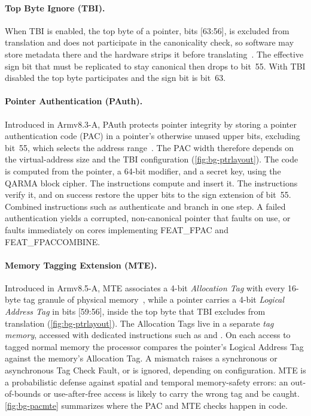 \paragraph{Top Byte Ignore (TBI).}
When TBI is enabled, the top byte of a pointer, bits [63:56], is excluded from translation and
does not participate in the canonicality check, so software may store metadata there and the
hardware strips it before translating~\cite{arm_tbi}. The effective sign bit that must be
replicated to stay canonical then drops to bit~55. With TBI disabled the top byte participates and
the sign bit is bit~63.

\paragraph{Pointer Authentication (PAuth).}
Introduced in Armv8.3-A, PAuth protects pointer integrity by storing a pointer authentication code
(PAC) in a pointer's otherwise unused upper bits, excluding bit~55, which selects the address
range~\cite{arm_pac,pac_whitepaper}. The PAC width therefore depends on the virtual-address size
and the TBI configuration (\autoref{fig:bg-ptrlayout}). The code is computed from the pointer, a
64-bit modifier, and a secret key, using the QARMA block cipher. The  instructions
compute and insert it. The  instructions verify it, and on success restore the upper bits
to the sign extension of bit~55. Combined instructions such as  authenticate and branch
in one step. A failed authentication yields a corrupted, non-canonical pointer that faults on use,
or faults immediately on cores implementing FEAT\_FPAC and FEAT\_FPACCOMBINE.

\paragraph{Memory Tagging Extension (MTE).}
Introduced in Armv8.5-A, MTE associates a 4-bit \emph{Allocation Tag} with every 16-byte tag
granule of physical memory~\cite{arm_mte,mte_whitepaper}, while a pointer carries a 4-bit
\emph{Logical Address Tag} in bits [59:56], inside the top byte that TBI excludes from translation
(\autoref{fig:bg-ptrlayout}). The Allocation Tags live in a separate \emph{tag memory}, accessed with
dedicated instructions such as  and . On each access to tagged normal memory the
processor compares the pointer's Logical Address Tag against the memory's Allocation Tag. A mismatch raises
a synchronous or asynchronous Tag Check Fault, or is ignored, depending on configuration. MTE is a
probabilistic defense against spatial and temporal memory-safety errors: an out-of-bounds or
use-after-free access is likely to carry the wrong tag and be caught. \autoref{fig:bg-pacmte}
summarizes where the PAC and MTE checks happen in code.

